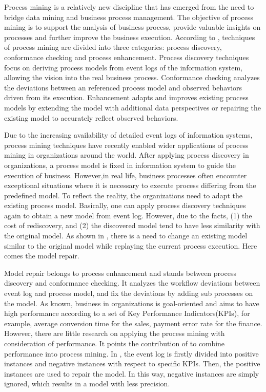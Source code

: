 %
Process mining is a relatively new discipline that has emerged from the need to bridge data mining and business process management. The objective of process mining is to support the analysis of business process, provide valuable insights on processes and further improve the business execution. According to \cite{van2011process}, techniques of process mining are divided into three categories: process discovery, conformance checking and process enhancement. Process discovery techniques focus on deriving process models from event logs of the information system, allowing the vision into the real business process. Conformance checking analyzes the deviations between an referenced process model and observed behaviors driven from its execution. Enhancement adapts and improves existing process models by extending the model with additional data perspectives or repairing the existing model to accurately reflect observed behaviors. 

Due to the increasing availability of detailed event logs of information systems, process mining techniques have recently enabled wider applications of process mining in organizations around the world\cite{van2011process}.  After applying process discovery in organizations, a process model is fixed in information system to guide the execution of business. However,in real life, business processes often encounter exceptional situations where it is necessary to execute process differing from the predefined model. To reflect the reality, the organizations need to adapt the existing process model. Basically, one can apply process discovery techniques again to obtain a new model from event log. However, due to the facts, (1) the cost of rediscovery, and (2)  the discovered model tend to have less similarity with the original model\cite{fahland2012repairing}. As shown in \cite{fahland2012repairing}, there is a need to change an existing model similar to the original model while replaying the current process execution. Here comes the model repair. 

Model repair belongs to process enhancement and stands between process discovery and conformance checking. It analyzes the workflow deviations between event log  and process model, and fix the deviations by adding sub processes on the model. As known, business in organizations is goal-oriented and aims to have high performance according to a set of Key Performance Indicators(KPIs), for example, average conversion time for the sales, payment error rate for the finance. However, there are little research on applying the process mining with consideration of performance\cite{ghasemi2016process}.  It points the contribution of \cite{dees2017enhancing} to combine performance into process mining. In \cite{dees2017enhancing}, the event log is firstly divided into positive instances and negative instances with respect to specific KPIs. Then, the positive instances are used to repair the model. In this way, negative instances are simply ignored, which results in a model with less precision. %

